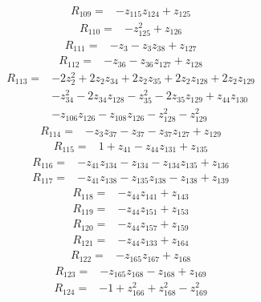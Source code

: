 \begin{align*}
R_{109}={}&-z_{115}z_{124}+z_{125}
\end{align*}
\begin{align*}
R_{110}={}&-z_{125}^{2}+z_{126}
\end{align*}
\begin{align*}
R_{111}={}&-z_{3}-z_{3}z_{38}+z_{127}
\end{align*}
\begin{align*}
R_{112}={}&-z_{36}-z_{36}z_{127}+z_{128}
\end{align*}
\begin{align*}
R_{113}={}&-2z_{2}^{2}+2z_{2}z_{34}+2z_{2}z_{35}+2z_{2}z_{128}+2z_{2}z_{129}\\
&-z_{34}^{2}-2z_{34}z_{128}-z_{35}^{2}-2z_{35}z_{129}+z_{44}z_{130}\\
&-z_{106}z_{126}-z_{108}z_{126}-z_{128}^{2}-z_{129}^{2}
\end{align*}
\begin{align*}
R_{114}={}&-z_{3}z_{37}-z_{37}-z_{37}z_{127}+z_{129}
\end{align*}
\begin{align*}
R_{115}={}&1+z_{41}-z_{44}z_{131}+z_{135}
\end{align*}
\begin{align*}
R_{116}={}&-z_{41}z_{134}-z_{134}-z_{134}z_{135}+z_{136}
\end{align*}
\begin{align*}
R_{117}={}&-z_{41}z_{138}-z_{135}z_{138}-z_{138}+z_{139}
\end{align*}
\begin{align*}
R_{118}={}&-z_{44}z_{141}+z_{143}
\end{align*}
\begin{align*}
R_{119}={}&-z_{44}z_{151}+z_{153}
\end{align*}
\begin{align*}
R_{120}={}&-z_{44}z_{157}+z_{159}
\end{align*}
\begin{align*}
R_{121}={}&-z_{44}z_{133}+z_{164}
\end{align*}
\begin{align*}
R_{122}={}&-z_{165}z_{167}+z_{168}
\end{align*}
\begin{align*}
R_{123}={}&-z_{165}z_{168}-z_{168}+z_{169}
\end{align*}
\begin{align*}
R_{124}={}&-1+z_{166}^{2}+z_{168}^{2}-z_{169}^{2}
\end{align*}
